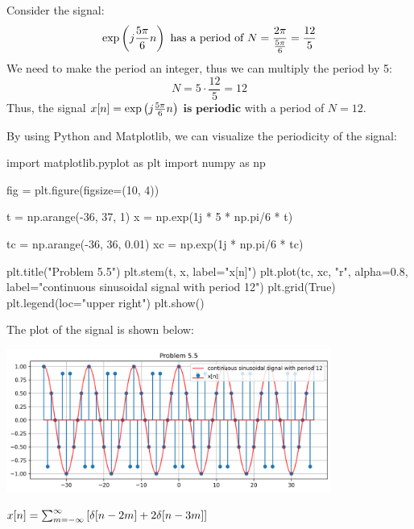 \documentclass[a4paper, 10pt]{article}
\begin{document}
\begin{solution}
Consider the signal:
\[
\exp \left( j\frac{5\pi}{6}n \right) \text{ has a period of } N = \frac{2\pi}{\frac{5\pi}{6}} = \frac{12}{5}
\]
We need to make the period an integer, thus we can multiply the period by 5:
\[
    N = 5 \cdot \frac{12}{5} = 12
\]
Thus, the signal \( x[n] = \exp \left( j\frac{5\pi}{6}n \right) \) \( \boxed{\textbf{is periodic}} \) with a period of \( \boxed{N = 12} \).

\vspace{5mm}

By using Python and Matplotlib, we can visualize the periodicity of the signal:
\begin{codingbox}
import matplotlib.pyplot as plt
import numpy as np

fig = plt.figure(figsize=(10, 4))

t = np.arange(-36, 37, 1)
x = np.exp(1j * 5 * np.pi/6 * t)

tc = np.arange(-36, 36, 0.01)
xc = np.exp(1j * np.pi/6 * tc)

plt.title("Problem 5.5")
plt.stem(t, x, label="x[n]")
plt.plot(tc, xc, "r", alpha=0.8, label="continuous sinusoidal signal with period 12")
plt.grid(True)
plt.legend(loc="upper right")
plt.show()
\end{codingbox}

The plot of the signal is shown below:
\begin{center}
    \includegraphics[width=0.8\textwidth]{images/problem_5_5.png}
\end{center}
\end{solution}

\newpage

\begin{subproblems}[start=6]
    \item \( x[n] =  \sum_{m=-\infty}^{\infty} \left[ \delta[n-2m] + 2\delta[n-3m] \right] \)
\end{subproblems}
\end{document}
